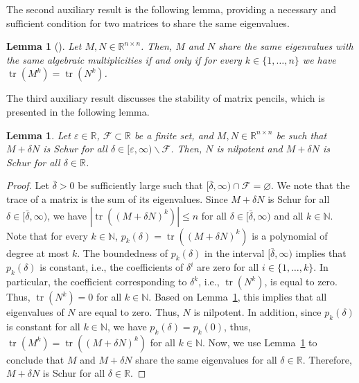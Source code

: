 \documentclass[9pt,shortpaper,twoside,web]{ieeecolor}
\DeclareMathOperator{\tr}{tr}
\newtheorem{lemma}[theorem]{Lemma}
\begin{document}
The second auxiliary result is the following lemma, providing a necessary and sufficient condition for two matrices to share the same eigenvalues.

\begin{lemma}[{\cite[2.4.P10]{horn2012matrix}}]
\label{lem:horn_2.4.P10}
Let $M,N\in\mathbb{R}^{n\times n}$. Then, $M$ and $N$ share the same eigenvalues with the same algebraic multiplicities \emph{if and only if} for every $k\in\{1,\ldots,n\}$ we have $\tr(M^k)=\tr(N^k)$. 
\end{lemma}

The third auxiliary result discusses the stability of matrix pencils, which is presented in the following lemma.

\begin{lemma}
\label{lem:A+delta*B}
Let $\varepsilon\in\mathbb{R}$, $\mathcal{F}\subset\mathbb{R}$ be a finite set, and $M,N\in\mathbb{R}^{n\times n}$ be such that $M+\delta N$ is Schur for all $\delta\in[\varepsilon,\infty)\backslash\mathcal{F}$. Then, $N$ is nilpotent and $M+\delta N$ is Schur for all $\delta\in\mathbb{R}$. 
\end{lemma}
\begin{proof}
Let $\bar{\delta}>0$ be sufficiently large such that $[\bar{\delta},\infty)\cap\mathcal{F}=\varnothing$. We note that the trace of a matrix is the sum of its eigenvalues. Since $M+\delta N$ is Schur for all $\delta\in[\bar{\delta},\infty)$, we have $|\tr ((M+\delta N)^k)|\leq n$ for all $\delta\in[\bar{\delta},\infty)$ and all $k\in\mathbb{N}$. Note that for every $k\in\mathbb{N}$, \mbox{$p_k(\delta)= \tr ((M+\delta N)^k)$} is a polynomial of degree at most $k$. The boundedness of $p_k(\delta)$ in the interval $[\bar{\delta},\infty)$ implies that $p_k(\delta)$ is constant, i.e., the coefficients of $\delta^i$ are zero for all $i\in\{1,\ldots,k\}$. In particular, the coefficient corresponding to $\delta^k$, i.e., $\tr(N^k)$, is equal to zero. Thus, $\tr(N^k)=0$ for all $k\in\mathbb{N}$. Based on Lemma~\ref{lem:horn_2.4.P10}, this implies that all eigenvalues of $N$ are equal to zero. Thus, $N$ is nilpotent. In addition, since $p_k(\delta)$ is constant for all $k\in\mathbb{N}$, we have $p_k(\delta)=p_k(0)$, thus, \mbox{$\tr(M^k)=\tr((M+\delta N)^k)$} for all $k\in\mathbb{N}$. Now, we use Lemma~\ref{lem:horn_2.4.P10} to conclude that $M$ and $M+\delta N$ share the same eigenvalues for all $\delta\in\mathbb{R}$. Therefore, $M+\delta N$ is Schur for all $\delta\in\mathbb{R}$. 
\end{proof}
\end{document}
